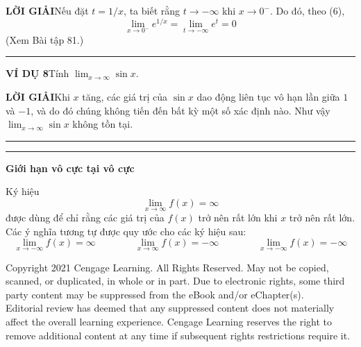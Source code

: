 \vspace{0.8ex}
\noindent
\textcolor{stewartblue}{\textsf{\textbf{LỜI GIẢI}}}\quad Nếu đặt $t = 1/x$, ta biết rằng $t \to -\infty$ khi $x \to 0^-$. Do đó, theo (6),
\[
\lim_{x \to 0^-} e^{1/x} = \lim_{t \to -\infty} e^t = 0
\]
\noindent
(Xem Bài tập 81.)\hfill\textcolor{stewartblue}{\rule{1.15ex}{1.15ex}}

\vspace{1.2ex}
\noindent
\textcolor{stewartblue}{\textsf{\textbf{VÍ DỤ 8}}}\quad Tính $\displaystyle \lim_{x \to \infty} \sin x$.

\vspace{0.8ex}
\noindent
\textcolor{stewartblue}{\textsf{\textbf{LỜI GIẢI}}}\quad Khi $x$ tăng, các giá trị của $\sin x$ dao động liên tục vô hạn lần giữa $1$ và $-1$, và do đó chúng không tiến đến bất kỳ một số xác định nào. Như vậy $\lim_{x \to \infty} \sin x$ không tồn tại.\hfill\textcolor{stewartblue}{\rule{1.15ex}{1.15ex}}

\vspace{2ex}
\noindent
\textcolor{stewartblue}{\rule{1.2ex}{1.2ex}}\hspace{0.5em}\textsf{\textbf{\large Giới hạn vô cực tại vô cực}}

\vspace{1ex}
\noindent
Ký hiệu
\[
\lim_{x \to \infty} f(x) = \infty
\]
được dùng để chỉ rằng các giá trị của $f(x)$ trở nên rất lớn khi $x$ trở nên rất lớn. Các ý nghĩa tương tự được quy ước cho các ký hiệu sau:
\[
\lim_{x \to -\infty} f(x) = \infty \qquad\qquad \lim_{x \to \infty} f(x) = -\infty \qquad\qquad \lim_{x \to -\infty} f(x) = -\infty
\]

\vfill
\begin{center}
\fontsize{5.5pt}{7pt}\selectfont\color{gray}
Copyright 2021 Cengage Learning. All Rights Reserved. May not be copied, scanned, or duplicated, in whole or in part. Due to electronic rights, some third party content may be suppressed from the eBook and/or eChapter(s).\\
Editorial review has deemed that any suppressed content does not materially affect the overall learning experience. Cengage Learning reserves the right to remove additional content at any time if subsequent rights restrictions require it.
\end{center}
